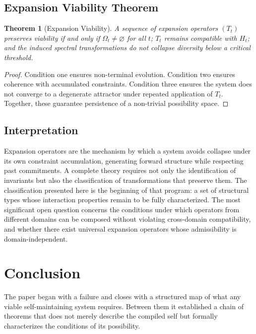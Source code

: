 \documentclass[12pt, a4paper]{article}
\theoremstyle{plain}
\newtheorem{theorem}{Theorem}[section]
\theoremstyle{definition}
\theoremstyle{remark}
\begin{document}
\subsection{Expansion Viability Theorem}

\begin{theorem}[Expansion Viability]
A sequence of expansion operators $(T_t)$ preserves viability if and only if $\Omega_t \neq \varnothing$ for all $t$; $T_t$ remains compatible with $H_t$; and the induced spectral transformations do not collapse diversity below a critical threshold.
\end{theorem}

\begin{proof}
Condition one ensures non-terminal evolution. Condition two ensures coherence with accumulated constraints. Condition three ensures the system does not converge to a degenerate attractor under repeated application of $T_t$. Together, these guarantee persistence of a non-trivial possibility space.
\end{proof}

\subsection{Interpretation}

Expansion operators are the mechanism by which a system avoids collapse under its own constraint accumulation, generating forward structure while respecting past commitments. A complete theory requires not only the identification of invariants but also the classification of transformations that preserve them. The classification presented here is the beginning of that program: a set of structural types whose interaction properties remain to be fully characterized. The most significant open question concerns the conditions under which operators from different domains can be composed without violating cross-domain compatibility, and whether there exist universal expansion operators whose admissibility is domain-independent.

\section*{Conclusion}

The paper began with a failure and closes with a structured map of what any viable self-maintaining system requires. Between them it established a chain of theorems that does not merely describe the compiled self but formally characterizes the conditions of its possibility.
\end{document}
